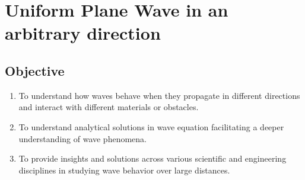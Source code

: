 \chapter{Uniform Plane Wave in an arbitrary direction}\label{lec:lec29}
\begin{mdframed}[backgroundcolor=lightblue, linewidth=1pt,  hidealllines=true]
\section{Objective}
\begin{enumerate}
	\item To understand how waves behave when they propagate in different directions and interact with different materials or obstacles.
	\item To understand analytical solutions in wave equation facilitating a deeper understanding of wave phenomena.
	\item To provide insights and solutions across various scientific and engineering disciplines in studying wave behavior over large distances.
\end{enumerate}
\end{mdframed}
